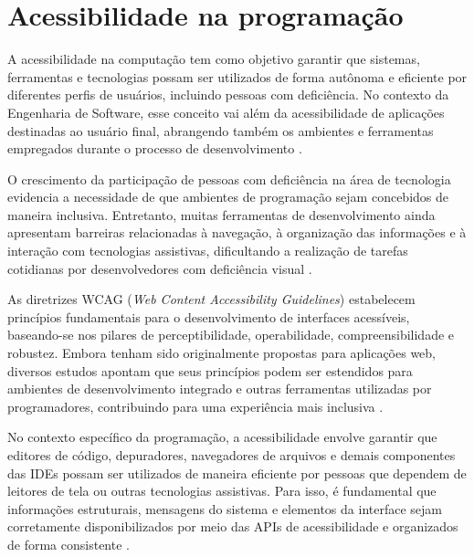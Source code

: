 \documentclass[
    12pt,                   %
    openright,              %
    oneside,                %
    a4paper,                %
    sumario=tradicional,    %
    english,                %
    brazil,                 %
    ]{abntex2}
\begin{document}
\section{Acessibilidade na programação}\label{sec:AcessComputacao}

A acessibilidade na computação tem como objetivo garantir que sistemas, ferramentas e tecnologias possam ser utilizados de forma autônoma e eficiente por diferentes perfis de usuários, incluindo pessoas com deficiência. No contexto da Engenharia de Software, esse conceito vai além da acessibilidade de aplicações destinadas ao usuário final, abrangendo também os ambientes e ferramentas empregados durante o processo de desenvolvimento \cite{latinoware37693}.

O crescimento da participação de pessoas com deficiência na área de tecnologia evidencia a necessidade de que ambientes de programação sejam concebidos de maneira inclusiva. Entretanto, muitas ferramentas de desenvolvimento ainda apresentam barreiras relacionadas à navegação, à organização das informações e à interação com tecnologias assistivas, dificultando a realização de tarefas cotidianas por desenvolvedores com deficiência visual \cite{latinoware20457}.

As diretrizes WCAG (\textit{Web Content Accessibility Guidelines}) estabelecem princípios fundamentais para o desenvolvimento de interfaces acessíveis, baseando-se nos pilares de perceptibilidade, operabilidade, compreensibilidade e robustez. Embora tenham sido originalmente propostas para aplicações web, diversos estudos apontam que seus princípios podem ser estendidos para ambientes de desenvolvimento integrado e outras ferramentas utilizadas por programadores, contribuindo para uma experiência mais inclusiva \cite{latinoware6969}.

No contexto específico da programação, a acessibilidade envolve garantir que editores de código, depuradores, navegadores de arquivos e demais componentes das IDEs possam ser utilizados de maneira eficiente por pessoas que dependem de leitores de tela ou outras tecnologias assistivas. Para isso, é fundamental que informações estruturais, mensagens do sistema e elementos da interface sejam corretamente disponibilizados por meio das APIs de acessibilidade e organizados de forma consistente \cite{latinoware37693}.
\end{document}

